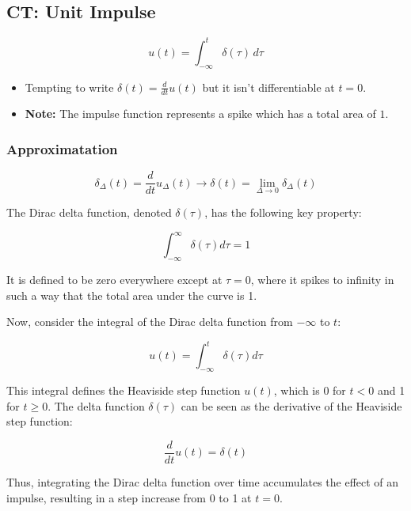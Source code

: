 \subsection{CT: Unit Impulse}
\begin{definition}
    \begin{equation}
        u(t) = \int_{-\infty}^{t} \delta(\tau) \, d\tau
    \end{equation}
    \begin{itemize}
        \item Tempting to write $\delta(t) = \frac{d}{dt} u(t)$ but it isn't differentiable at $t=0$.
        \item \textbf{Note:} The impulse function represents a spike which has a total area of $1$.
    \end{itemize}

\end{definition}

    \subsubsection{Approximatation}
    \begin{derivation}
        \begin{equation}
            \delta_{\Delta}(t) = \frac{d}{dt} u_{\Delta}(t) \rightarrow \delta(t) = \lim_{\Delta \to 0} \delta_{\Delta}(t)
        \end{equation}

    \end{derivation}

    \begin{intuition}
        The Dirac delta function, denoted \(\delta(\tau)\), has the following key property:
    
        \[
        \int_{-\infty}^{\infty} \delta(\tau) d\tau = 1
        \]
    
        It is defined to be zero everywhere except at \(\tau = 0\), where it spikes to infinity in such a way that the total area under the curve is 1.
        \vspace{1em}
        
        Now, consider the integral of the Dirac delta function from \(-\infty\) to \(t\):
    
        \[
        u(t) = \int_{-\infty}^{t} \delta(\tau) d\tau
        \]
    
        This integral defines the Heaviside step function \(u(t)\), which is 0 for \(t < 0\) and 1 for \(t \geq 0\). The delta function \(\delta(\tau)\) can be seen as the derivative of the Heaviside step function:
    
        \[
        \frac{d}{dt} u(t) = \delta(t)
        \]
    
        Thus, integrating the Dirac delta function over time accumulates the effect of an impulse, resulting in a step increase from 0 to 1 at \(t = 0\).
    
    \end{intuition}

